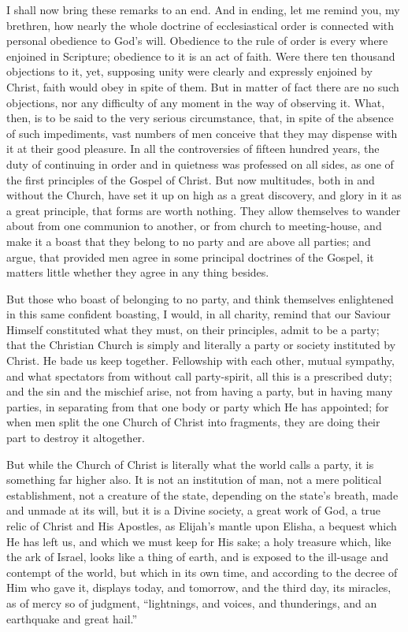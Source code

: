 I shall now bring these remarks to an end. And in ending, let me
remind you, my brethren, how nearly the whole doctrine of
ecclesiastical order is connected with personal obedience to God's
will. Obedience to the rule of order is every where enjoined in
Scripture; obedience to it is an act of faith. Were there ten thousand
objections to it, yet, supposing unity were clearly and expressly
enjoined by Christ, faith would obey in spite of them. But in matter
of fact there are no such objections, nor any difficulty of any moment
in the way of observing it. What, then, is to be said to the very
serious circumstance, that, in spite of the absence of such
impediments, vast numbers of men conceive that they may dispense with
it at their good pleasure. In all the controversies of fifteen hundred
years, the duty of continuing in order and in quietness was professed
on all sides, as one of the first principles of the Gospel of Christ.
But now multitudes, both in and without the Church, have set it up on
high as a great discovery, and glory in it as a great principle, that
forms are worth nothing. They allow themselves to wander about from
one communion to another, or from church to meeting-house, and make it
a boast that they belong to no party and are above all parties; and
argue, that provided men agree in some principal doctrines of the
Gospel, it matters little whether they agree in any thing besides.

But those who boast of belonging to no party, and think themselves
enlightened in this same confident boasting, I would, in all charity,
remind that our Saviour Himself constituted what they must, on their
principles, admit to be a party; that the Christian Church is simply
and literally a party or society instituted by Christ. He bade us keep
together. Fellowship with each other, mutual sympathy, and what
spectators from without call party-spirit, all this is a prescribed
duty; and the sin and the mischief arise, not from having a party, but
in having many parties, in separating from that one body or party
which He has appointed; for when men split the one Church of Christ
into fragments, they are doing their part to destroy it altogether.

But while the Church of Christ is literally what the world calls a
party, it is something far higher also. It is not an institution of
man, not a mere political establishment, not a creature of the state,
depending on the state's breath, made and unmade at its will, but it
is a Divine society, a great work of God, a true relic of Christ and
His Apostles, as Elijah's mantle upon Elisha, a bequest which He has
left us, and which we must keep for His sake; a holy treasure which,
like the ark of Israel, looks like a thing of earth, and is exposed to
the ill-usage and contempt of the world, but which in its own time,
and according to the decree of Him who gave it, displays today, and
tomorrow, and the third day, its miracles, as of mercy so of judgment,
``lightnings, and voices, and thunderings, and an earthquake and
great hail.''

